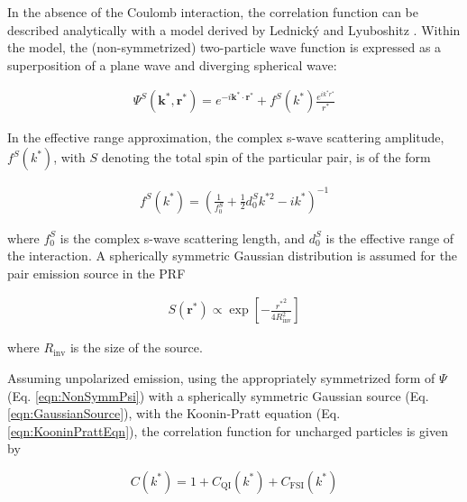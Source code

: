 \documentclass[ALICE,manyauthors]{cernphprep}
\begin{document}
In the absence of the Coulomb interaction, the correlation function can be described analytically with a model derived by Lednick\'y and Lyuboshitz \cite{Lednicky:82}.
Within the model, the (non-symmetrized) two-particle wave function is expressed as a superposition of a plane wave and diverging spherical wave:

\begin{equation}
\begin{aligned}
\Psi^{S}(\mathbf{k}^{*}, \mathbf{r}^{*}) = e^{-i\mathbf{k}^{*} \cdot \mathbf{r}^{*}} + f^{S}(k^{*})\frac{e^{ik^{*}r^{*}}}{r^{*}}
\end{aligned}  
\label{eqn:NonSymmPsi}
\end{equation}

In the effective range approximation, the complex s-wave scattering amplitude, $f^{S}(k^{*})$, with $S$ denoting the total spin of the particular pair, is of the form

\begin{equation}
\begin{aligned}
f^{S}(k^{*}) = \left( \frac{1}{f^{S}_{0}} + \frac{1}{2}d^{S}_{0}k^{*2} - ik^{*} \right)^{-1}
\end{aligned}
\label{eqn:ScatteringParam}
\end{equation}

where $f^{S}_{0}$ is the complex s-wave scattering length, and $d^{S}_{0}$ is the effective range of the interaction.
A spherically symmetric Gaussian distribution is assumed for the pair emission source in the PRF

\begin{equation}
\begin{aligned}
S(\mathbf{r}^{*}) \propto \exp\left[ -\frac{{r^{*}}^{2}}{4R_{\mathrm{inv}}^{2}}\right]
\end{aligned}
\label{eqn:GaussianSource}
\end{equation} 

where $R_{\mathrm{inv}}$ is the size of the source.

Assuming unpolarized emission, using the appropriately symmetrized form of $\Psi$ (Eq. \ref{eqn:NonSymmPsi}) with a spherically symmetric Gaussian source (Eq. \ref{eqn:GaussianSource}), with the Koonin-Pratt equation (Eq. \ref{eqn:KooninPrattEqn}), the correlation function for uncharged particles is given by \cite{Lednicky:82}

\begin{equation}
 C(k^{*}) = 1 + C_{\mathrm{QI}}(k^{*}) + C_{\mathrm{FSI}}(k^{*})
\label{eqn:LednickyEqn}
\end{equation}
\end{document}
